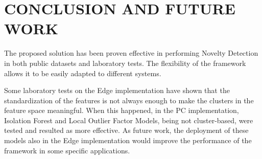 \section{CONCLUSION AND FUTURE WORK}

The proposed solution has been proven effective in performing Novelty Detection in both public datasets and laboratory tests. The flexibility of the framework allows it to be easily adapted to different systems. 

Some laboratory tests on the Edge implementation have shown that the standardization of the features is not always enough to make the clusters in the feature space meaningful. When this happened, in the PC implementation, Isolation Forest and Local Outlier Factor Models, being not cluster-based, were tested and resulted as more effective. As future work, the deployment of these models also in the Edge implementation would improve the performance of the framework in some specific applications.